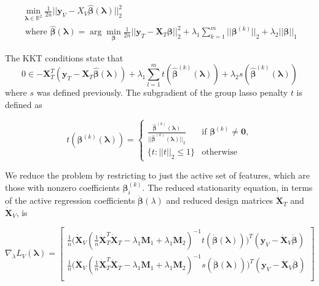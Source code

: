 \documentclass[10pt,letterpaper]{article}
\begin{document}
\begin{equation}
\begin{array}{c}
\min_{\boldsymbol{\lambda} \in \mathbb{R}^2} \frac{1}{2n} \bigl\lvert\bigl\lvert \boldsymbol{y}_V - X_V \hat{\boldsymbol{\beta}}(\boldsymbol{\lambda}) \bigl\rvert\bigl\rvert^2_2 \\
\text{ where }
\hat{\boldsymbol{\beta}}(\boldsymbol{\lambda}) = \arg\min_{\boldsymbol{\beta}} \frac{1}{2n} \bigl\lvert\bigl\lvert \boldsymbol{y}_T - \boldsymbol{X}_T \boldsymbol{\beta} \bigl\rvert\bigl\rvert^2_2
+ \lambda_1 \sum_{k=1}^m \lvert\lvert \boldsymbol\beta^{(k)} \rvert \rvert_2
+ \lambda_2 \lvert\lvert \boldsymbol\beta \rvert \rvert_1
\end{array}
\end{equation}

The KKT conditions state that
\begin{equation}
0 \in -\boldsymbol{X}_T^T(\boldsymbol{y}_T - \boldsymbol{X}_T \hat{\boldsymbol{\beta}}(\boldsymbol{\lambda}))
+ \lambda_1 \sum\limits_{l=1}^m t(\hat{\boldsymbol{\beta}}^{(k)}(\boldsymbol{\lambda}))
+ \lambda_2 s(\hat{\boldsymbol{\beta}}^{(k)}(\boldsymbol{\lambda}))
\end{equation}
where $s$ was defined previously. The subgradient of the group lasso penalty $t$ is defined as

\begin{equation}
t(\boldsymbol{\beta}^{(k)}(\boldsymbol{\lambda})) = \begin{cases}
  \frac{ \hat{\boldsymbol{\beta}}^{(k)}(\boldsymbol{\lambda})}{||\hat{\boldsymbol{\beta}}^{(k)}(\boldsymbol{\lambda}) ||_2} & \text{if } \boldsymbol\beta^{(k)} \ne \boldsymbol{0}, \\
\{t : ||t||_2 \le 1\} & \text{otherwise}
\end{cases}
\end{equation}

We reduce the problem by restricting to just the active set of features, which are those with nonzero coefficients $\boldsymbol{\beta}^{(k)}_i$. The reduced stationarity equation, in terms of the active regression coefficients $\dot{\boldsymbol{\beta}} (\lambda)$ and reduced design matrices $\dot{\boldsymbol{X}}_T$ and $\dot{\boldsymbol{X}}_V$, is

\begin{equation}
\nabla_\lambda L_V(\boldsymbol{\lambda}) =
\begin{bmatrix}
\frac{1}{n}
\Bigg (
\dot{\boldsymbol{X}}_V
(\frac{1}{n} \dot{\boldsymbol{X}}_T^T \dot{\boldsymbol{X}}_T - \lambda_1 \boldsymbol{M}_1 + \lambda_1 \boldsymbol{M}_2)^{-1}
t(\dot{\boldsymbol{\beta}}(\boldsymbol{\lambda}))
\Bigg )^T
(\boldsymbol{y}_V - \dot{\boldsymbol{X}}_V \dot{\boldsymbol{\beta}})
 \\
\frac{1}{n}
\Bigg (\dot{\boldsymbol{X}}_V
(\frac{1}{n} \dot{\boldsymbol{X}}_T^T \dot{\boldsymbol{X}}_T - \lambda_1 \boldsymbol{M}_1 + \lambda_1 \boldsymbol{M}_2)^{-1}
s(\dot{\boldsymbol{\beta}}(\boldsymbol{\lambda}))
\Bigg )^T
(\boldsymbol{y}_V - \dot{\boldsymbol{X}}_V \dot{\boldsymbol{\beta}})
\\ 
\end{bmatrix}
\end{equation}
\end{document}
